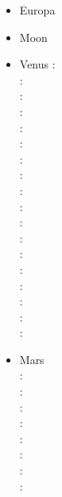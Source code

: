 \begin{itemize}
\item Europa 
{\scriptsize
\cite{shha04,shha05,mish05,hash08}\cite{hash10}\cite{hash11,kast14,almc19}
}
\item Moon 
{\scriptsize
\cite{elvh02}\cite{elhg04}\cite{devv10}\cite{dejv13} \cite{zhdv19}
} 
\item Venus 
{\scriptsize
\nineteenninety: \cite{scbg90,ogaw00}\\
\nineteenninetyone: \cite{lekb91}\\
\nineteenninetytwo: \cite{kiha92,sqjs92}\\
\nineteenninetythree: \cite{kief93,lekb93,ogaw93}\\
\nineteenninetyfive: \cite{lekb95,mopa95}\\
\nineteenninetysix: \cite{somo96}\\
\nineteenninetyeight: \cite{mazk98}\cite{resm98}\cite{moso98}\cite{phha98}\\
\nineteenninetynine: \cite{resm99}\\
\twothousandthree: \cite{vesh03}\\
\twothousandfive: \cite{vavv05}\\
\twothousandten: \cite{stfh10}\\
\twothousandeleven: \cite{orso11}\\
\twothousandtwelve: \cite{arta12}\\
\twothousandthirteen: \cite{huyz13}\\
\twothousandfourteen: \cite{gita14}\cite{gery14b}\\
\twothousandseventeen: \cite{cram17}\cite{dast17}\\
\twothousandeighteen: \cite{king18}\\
\twothousandtwenty: \cite{weki20}
}
\item Mars \\
{\scriptsize
\nineteenninety: \cite{scbg90}\\
\nineteenninetysix: \cite{hach96}\\
\nineteenninetyeight: \cite{resm98}\\
\twothousandone: \cite{nist01}\\
\twothousandfour: \cite{lenm04}\cite{vavv04c}\\
\twothousandfive: \cite{vavv05}\cite{onml05}\\
\twothousandsix: \cite{losh06,rozh06,keso06}\\
\twothousandseven: \cite{rozh07}\\
}
\end{itemize}
